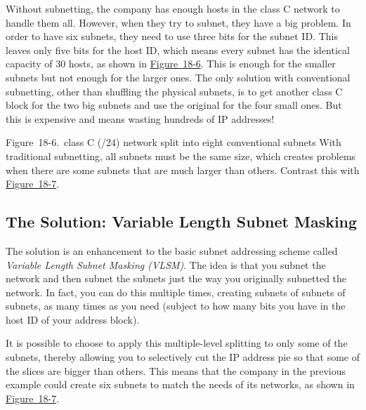 Without subnetting, the company has enough hosts in the class C network
to handle them all. However, when they try to subnet, they have a big
problem. In order to have six subnets, they need to use three bits for
the subnet ID. This leaves only five bits for the host ID, which means
every subnet has the identical capacity of 30 hosts, as shown in
\protect\hyperlink{ch18s08.htmlux5cux23class_c_24_network_split_into_eight_conv}{Figure~18-6}.
This is enough for the smaller subnets but not enough for the larger
ones. The only solution with conventional subnetting, other than
shuffling the physical subnets, is to get another class C block for the
two big subnets and use the original for the four small ones. But this
is expensive and means wasting hundreds of IP addresses!





Figure~18-6.~class C (/24) network split into eight conventional subnets
With traditional subnetting, all subnets must be the same size, which
creates problems when there are some subnets that are much larger than
others. Contrast this with
\protect\hyperlink{ch18s08.htmlux5cux23class_c_24_network_split_using_vlsm_usin}{Figure~18-7}.

\subsection[The Solution: Variable Length Subnet
Masking]{\texorpdfstring{The
Solution: Variable Length Subnet
Masking}{The Solution: Variable Length Subnet Masking}}

The
solution is an enhancement to the basic subnet addressing scheme called
{\emph{Variable Length Subnet Masking (VLSM)}}. The idea is that you
subnet the network and then subnet the subnets just the way you
originally subnetted the network. In fact, you can do this multiple
times, creating subnets of subnets of subnets, as many times as you need
(subject to how many bits you have in the host ID of your address
block).

It is possible to choose to apply this multiple-level splitting to only
some of the subnets, thereby allowing you to selectively cut the IP
address pie so that some of the slices are bigger than others. This
means that the company in the previous example could create six subnets
to match the needs of its networks, as shown in
\protect\hyperlink{ch18s08.htmlux5cux23class_c_24_network_split_using_vlsm_usin}{Figure~18-7}.





